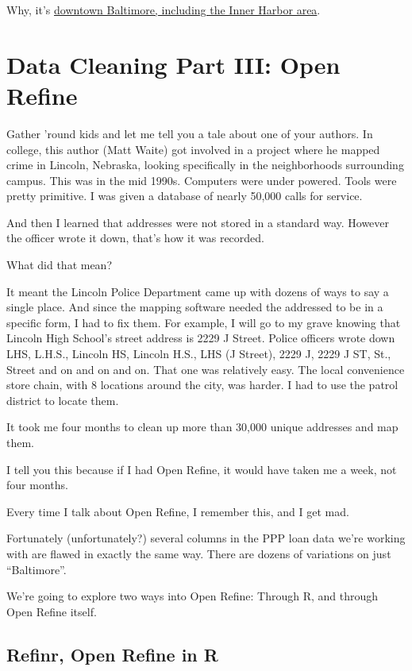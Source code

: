 \documentclass[
  letterpaper,
  DIV=11,
  numbers=noendperiod]{scrreprt}
\begin{document}
Why, it's
\href{https://censusreporter.org/profiles/86000US21202-21202/}{downtown
Baltimore, including the Inner Harbor area}.


\hypertarget{data-cleaning-part-iii-open-refine}{%
\chapter{Data Cleaning Part III: Open
Refine}\label{data-cleaning-part-iii-open-refine}}

Gather 'round kids and let me tell you a tale about one of your authors.
In college, this author (Matt Waite) got involved in a project where he
mapped crime in Lincoln, Nebraska, looking specifically in the
neighborhoods surrounding campus. This was in the mid 1990s. Computers
were under powered. Tools were pretty primitive. I was given a database
of nearly 50,000 calls for service.

And then I learned that addresses were not stored in a standard way.
However the officer wrote it down, that's how it was recorded.

What did that mean?

It meant the Lincoln Police Department came up with dozens of ways to
say a single place. And since the mapping software needed the addressed
to be in a specific form, I had to fix them. For example, I will go to
my grave knowing that Lincoln High School's street address is 2229 J
Street. Police officers wrote down LHS, L.H.S., Lincoln HS, Lincoln
H.S., LHS (J Street), 2229 J, 2229 J ST, St., Street and on and on and
on. That one was relatively easy. The local convenience store chain,
with 8 locations around the city, was harder. I had to use the patrol
district to locate them.

It took me four months to clean up more than 30,000 unique addresses and
map them.

I tell you this because if I had Open Refine, it would have taken me a
week, not four months.

Every time I talk about Open Refine, I remember this, and I get mad.

Fortunately (unfortunately?) several columns in the PPP loan data we're
working with are flawed in exactly the same way. There are dozens of
variations on just ``Baltimore''.

We're going to explore two ways into Open Refine: Through R, and through
Open Refine itself.

\hypertarget{refinr-open-refine-in-r}{%
\section{Refinr, Open Refine in R}\label{refinr-open-refine-in-r}}
\end{document}
